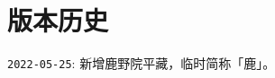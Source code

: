 \section*{版本历史}

\begin{compactitem}
    \item \texttt{2022-05-25}: 新增鹿野院平藏，临时简称「鹿」。
\end{compactitem}




